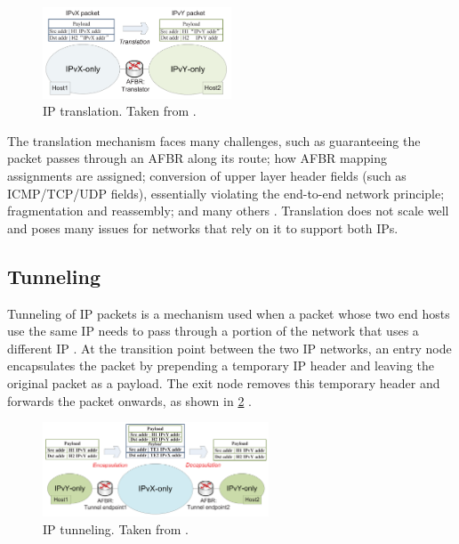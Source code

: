 \begin{figure}[htbp]
  \centering
    \includegraphics[width=0.5\textwidth]{figures/implementation/translation.png}
     \caption{IP translation. Taken from \cite{TransitionsPaper}.}
     \label{fig:impl-translation}
\end{figure}

The translation mechanism faces many challenges, such as guaranteeing the packet passes through an AFBR along its route; how AFBR mapping assignments are assigned; conversion of upper layer header fields (such as ICMP/TCP/UDP fields), essentially violating the end-to-end network principle; fragmentation and reassembly; and many others \cite{TransitionsPaper}. Translation does not scale well and poses many issues for networks that rely on it to support both IPs.



\subsection{Tunneling}
\label{sec:3.8.2}

Tunneling of IP packets is a mechanism used when a packet whose two end hosts use the same IP needs to pass through a portion of the network that uses a different IP \cite{Tunneling}. At the transition point between the two IP networks, an entry node encapsulates the packet by prepending a temporary IP header and leaving the original packet as a payload. The exit node removes this temporary header and forwards the packet onwards, as shown in \cref{fig:impl-tunneling} \cite{Tunneling}.

\begin{figure}[htbp]
  \centering
    \includegraphics[width=0.6\textwidth]{figures/implementation/tunneling.png}
     \caption{IP tunneling. Taken from \cite{TransitionsPaper}.}
     \label{fig:impl-tunneling}
\end{figure}

